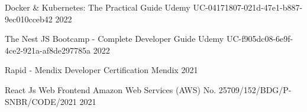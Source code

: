 

\begin{cvhonors}

  \cvhonor
    {Docker & Kubernetes: The Practical Guide} %
    {Udemy} %
    {UC-04171807-021d-47e1-b887-9ec010cceb42} %
    {2022} %

  \cvhonor
    {The Nest JS Bootcamp - Complete Developer Guide} %
    {Udemy} %
    {UC-f905dc08-6e9f-4ce2-921a-af8de297785a} %
    {2022} %

  \cvhonor
    {Rapid - Mendix Developer Certification} %
    {Mendix} %
    {} %
    {2021} %

  \cvhonor
    {React Js Web Frontend} %
    {Amazon Web Services (AWS)} %
    {No. 25709/152/BDG/P-SNBR/CODE/2021} %
    {2021} %

\end{cvhonors}